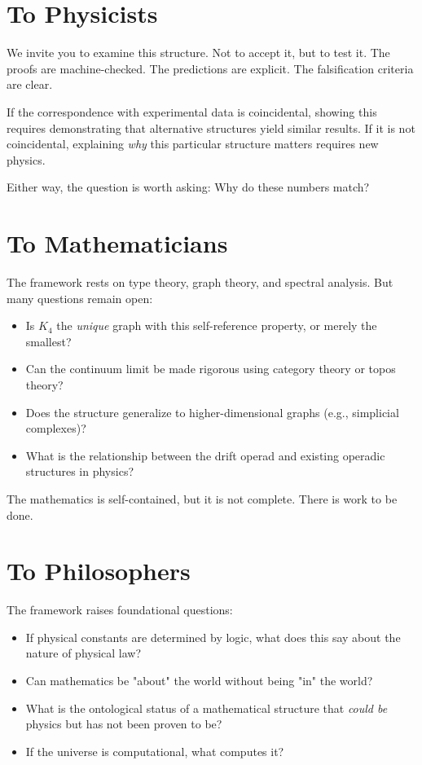 \documentclass[11pt,a4paper]{book}
\begin{document}
\section{To Physicists}

We invite you to examine this structure. Not to accept it, but to test it. The proofs are machine-checked. The predictions are explicit. The falsification criteria are clear.

If the correspondence with experimental data is coincidental, showing this requires demonstrating that alternative structures yield similar results. If it is not coincidental, explaining \emph{why} this particular structure matters requires new physics.

Either way, the question is worth asking: Why do these numbers match?

\section{To Mathematicians}

The framework rests on type theory, graph theory, and spectral analysis. But many questions remain open:

\begin{itemize}
\item Is $K_4$ the \emph{unique} graph with this self-reference property, or merely the smallest?
\item Can the continuum limit be made rigorous using category theory or topos theory?
\item Does the structure generalize to higher-dimensional graphs (e.g., simplicial complexes)?
\item What is the relationship between the drift operad and existing operadic structures in physics?
\end{itemize}

The mathematics is self-contained, but it is not complete. There is work to be done.

\section{To Philosophers}

The framework raises foundational questions:

\begin{itemize}
\item If physical constants are determined by logic, what does this say about the nature of physical law?
\item Can mathematics be "about" the world without being "in" the world?
\item What is the ontological status of a mathematical structure that \emph{could be} physics but has not been proven to be?
\item If the universe is computational, what computes it?
\end{itemize}
\end{document}
